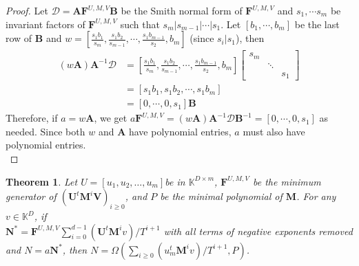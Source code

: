 \documentclass[12pt]{article}
\def\K {\ensuremath{\mathbb{K}}}
\newtheorem{theorem}[definition]{Theorem}
\def\K{\mathbb{K}}
\def\mA{\mathbf{A}}
\def\mB{\mathbf{B}}
\def\mF{\mathbf{F}}
\def\mM{\mathbf{M}}
\def\mN{\mathbf{N}}
\def\mU{\mathbf{U}}
\def\mV{\mathbf{V}}
\begin{document}
\begin{proof}
	Let $\mathscr{D} = \mA\mF^{U,M,V}\mB$ be the Smith normal form of $\mF^{U,M,V}$ and $s_1, \cdots s_m$ be
	invariant factors of $\mF^{U,M,V}$ such that 
	$s_m | s_{m-1} | \cdots | s_1$.
	Let $[b_1,\cdots,b_m]$ be the last row of $\mB$ and 
	$w = [\frac{s_1b_1}{s_m},\frac{s_1b_2}{s_{m-1}},\cdots,\frac{s_1b_{m-1}}{s_2},b_m]$ (since $s_i | s_1$), then
	\begin{align*}
	(w \mA) \mA^{-1} \mathscr{D} &=  [\frac{s_1b_1}{s_m},\frac{s_1b_2}{s_{m-1}},\cdots,\frac{s_1b_{m-1}}{s_2},b_m]
	\begin{bmatrix}
	s_m &        & \\
	& \ddots & \\
	&        & s_1
	\end{bmatrix}\\
	&= [s_1b_1, s_1b_2, \cdots, s_1b_m]\\
	&= [0,\cdots,0,s_1] \mB
	\end{align*}
	Therefore, if $a = w \mA$, we get
	$ a \mF^{U,M,V} = (w \mA) \mA^{-1} \mathscr{D} \mB^{-1} = 
	[0,\cdots,0,s_1]$ as needed. Since both $w$ and $\mA$ have polynomial
	entries, $a$ must also have polynomial entries.\\
\end{proof}

\begin{theorem}
	 Let $U = [u_1,u_2,\dots,u_m]$be in $\K^{D\times m}$,
	 $\mF^{U,M,V}$ be the minimum generator of $(\mU^t \mM^i \mV)_{i\ge0}$,
	 and $P$ be the minimal polynomial of $\mM$. For any 
	 $v \in \K^{D}$, if\\ 
	 $\mN^* = \mF^{U,M,V}\sum_{i=0}^{d-1} (\mU^t \mM^i v)/T^{i+1}$ 
	 with all terms of negative exponents removed
	 and $N = a\mN^*$,
	 then $N = \Omega(\sum_{i\ge0}(u_m^t \mM^i v)/T^{i+1},P)$.
	 \label{theorem:anyv}
\end{theorem}
\end{document}
